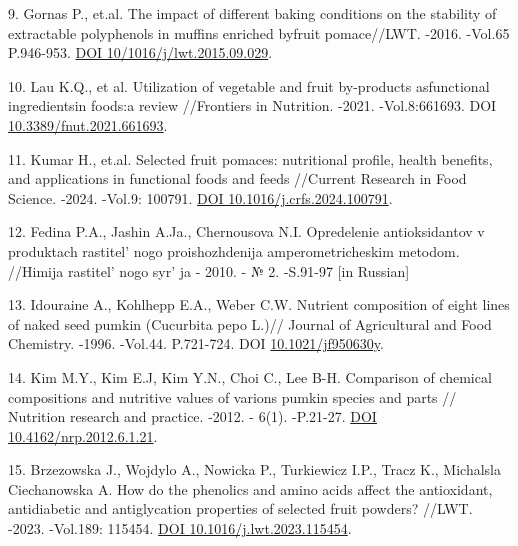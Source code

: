 \begin{refs}
9. Gornas P., et.al. The impact of different baking conditions on the
stability of extractable polyphenols in muffins enriched byfruit
pomace//LWT. -2016. -Vol.65 P.946-953.
\href{https://doi.org/10/1016/j/lwt.2015.09.029}{DOI
10/1016/j/lwt.2015.09.029}.

10. Lau K.Q., et al. Utilization of vegetable and fruit by-products
asfunctional ingredientsin foods:a review //Frontiers in Nutrition.
-2021. -Vol.8:661693. DOI
\href{https://doi/org/10.3389/fnut.2021.661693}{10.3389/fnut.2021.661693}.

11. Kumar H., et.al. Selected fruit pomaces: nutritional profile, health
benefits, and applications in functional foods and feeds //Current
Research in Food Science. -2024. -Vol.9: 100791.
\href{https://doi.org/?10.1016/j.crfs.2024.100791}{DOI
10.1016/j.crfs.2024.100791}.

12. Fedina P.A., Jashin A.Ja., Chernousova N.I. Opredelenie
antioksidantov v produktach rastitel' nogo
proishozhdenija amperometricheskim metodom. //Himija
rastitel' nogo syr' ja - 2010. - № 2.
-S.91-97 {[}in Russian{]}

13. Idouraine A., Kohlhepp E.A., Weber C.W. Nutrient composition of
eight lines of naked seed pumkin (Cucurbita pepo L.)// Journal of
Agricultural and Food Chemistry. -1996. -Vol.44. P.721-724. DOI
\href{https://doi.org/10.1021/jf950630y}{10.1021/jf950630y}.

14. Kim M.Y., Kim E.J, Kim Y.N., Choi C., Lee B-H. Comparison of
chemical compositions and nutritive values of varions pumkin species and
parts // Nutrition research and practice. -2012. - 6(1). -P.21-27.
\href{https://doi.org/10.4162/nrp.2012.6.1.21}{DOI
10.4162/nrp.2012.6.1.21}.

15. Brzezowska J., Wojdylo A., Nowicka P., Turkiewicz I.P., Tracz K.,
Michalsla Ciechanowska A. How do the phenolics and amino acids affect
the antioxidant, antidiabetic and antiglycation properties of selected
fruit powders? //LWT. -2023. -Vol.189: 115454.
\href{https://doi.org/10/1016/j.lwt.2023.115454}{DOI
10.1016/j.lwt.2023.115454}.
\end{refs}

